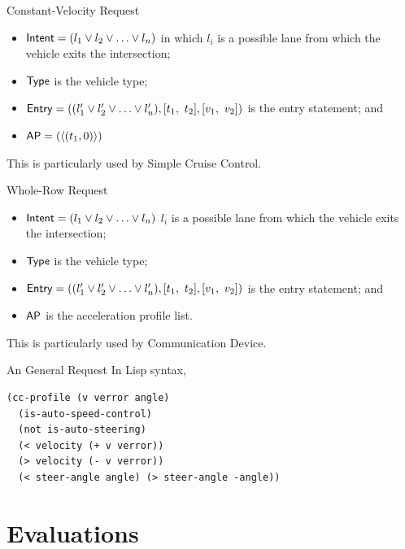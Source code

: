 \documentclass{beamer}
\begin{document}
\begin{frame}{Constant-Velocity Request}
\begin{itemize}
\item ${\sf Intent} = ( l_1 \vee l_2 \vee \ldots \vee l_n )$
in which $l_i$ is a possible lane from which the vehicle 
exits the intersection;
\item ${\sf Type}$ is the vehicle type;
\item ${\sf Entry} = (( l'_1 \vee l'_2 \vee \ldots \vee l'_n ), [t_1,\ t_2], [v_1,\ v_2])$
is the entry statement; and
\item ${\sf AP} = ( \langle (t_1, 0) \rangle )$
\end{itemize}

This is particularly used by Simple Cruise Control.
\end{frame}

\begin{frame}{Whole-Row Request}
\begin{itemize}
\item ${\sf Intent} = ( l_1 \vee l_2 \vee \ldots \vee l_n )$ $l_i$ is a possible lane from which the vehicle exits the intersection;
\item ${\sf Type}$ is the vehicle type;
\item ${\sf Entry} = (( l'_1 \vee l'_2 \vee \ldots \vee l'_n ), [t_1,\ t_2], [v_1,\ v_2])$ is the entry statement; and
\item ${\sf AP}$ is the acceleration profile list.
\end{itemize}

This is particularly used by Communication Device.
\end{frame}

\begin{frame}[fragile]{An General Request}
In Lisp syntax,

\begin{small}
\begin{verbatim}
(cc-profile (v verror angle)
  (is-auto-speed-control)
  (not is-auto-steering)
  (< velocity (+ v verror))
  (> velocity (- v verror))
  (< steer-angle angle) (> steer-angle -angle))
\end{verbatim}
\end{small}
\end{frame}

\section{Evaluations}
\end{document}
